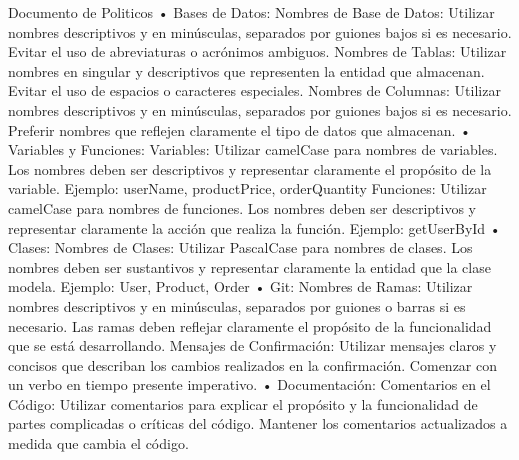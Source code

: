 Documento de Politicos
•	Bases de Datos:
Nombres de Base de Datos: Utilizar nombres descriptivos y en minúsculas, separados por guiones bajos si es necesario. Evitar el uso de abreviaturas o acrónimos ambiguos.
Nombres de Tablas: Utilizar nombres en singular y descriptivos que representen la entidad que almacenan. Evitar el uso de espacios o caracteres especiales.
Nombres de Columnas: Utilizar nombres descriptivos y en minúsculas, separados por guiones bajos si es necesario. Preferir nombres que reflejen claramente el tipo de datos que almacenan.
•	Variables y Funciones:
Variables: Utilizar camelCase para nombres de variables. Los nombres deben ser descriptivos y representar claramente el propósito de la variable.
Ejemplo: userName, productPrice, orderQuantity
Funciones: Utilizar camelCase para nombres de funciones. Los nombres deben ser descriptivos y representar claramente la acción que realiza la función.
Ejemplo: getUserById
•	Clases:
Nombres de Clases: Utilizar PascalCase para nombres de clases. Los nombres deben ser sustantivos y representar claramente la entidad que la clase modela.
Ejemplo: User, Product, Order
•	Git:
Nombres de Ramas: Utilizar nombres descriptivos y en minúsculas, separados por guiones o barras si es necesario. Las ramas deben reflejar claramente el propósito de la funcionalidad que se está desarrollando.
Mensajes de Confirmación: Utilizar mensajes claros y concisos que describan los cambios realizados en la confirmación. Comenzar con un verbo en tiempo presente imperativo.
•	Documentación:
Comentarios en el Código: Utilizar comentarios para explicar el propósito y la funcionalidad de partes complicadas o críticas del código. Mantener los comentarios actualizados a medida que cambia el código.

